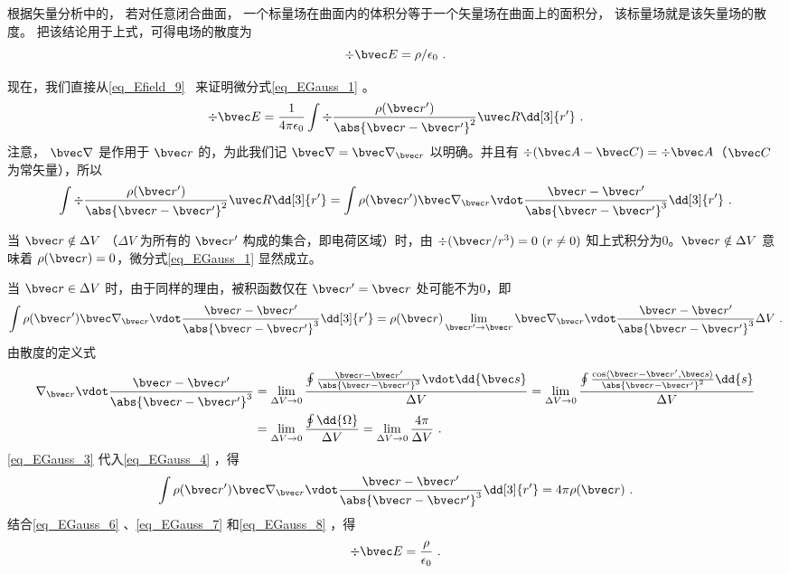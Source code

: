 根据矢量分析中的， 若对任意闭合曲面， 一个标量场在曲面内的体积分等于一个矢量场在曲面上的面积分， 该标量场就是该矢量场的散度。 把该结论用于上式，可得电场的散度为
\begin{equation}
\div \bvec E = \rho / \epsilon_0~.
\end{equation}

现在，我们直接从\autoref{eq_Efield_9}~ 来证明微分式\autoref{eq_EGauss_1} 。
\begin{equation}\label{eq_EGauss_6}
\div \bvec E=\frac{1}{4\pi\epsilon_0}\int\div\frac{\rho(\bvec r')}{\abs{\bvec r-\bvec r'}^2}\uvec R\dd[3]{r'}~.
\end{equation}
注意， $\bvec\nabla$ 是作用于 $\bvec r$ 的，为此我们记 $\bvec\nabla=\bvec\nabla_{\bvec r}$ 以明确。并且有 $\div (\bvec A-\bvec C)=\div \bvec A$（$\bvec C$ 为常矢量），所以
\begin{equation}\label{eq_EGauss_7}
\int\div\frac{\rho(\bvec r')}{\abs{\bvec r-\bvec r'}^2}\uvec R\dd[3]{r'}=\int\rho(\bvec r')\bvec\nabla_{\bvec r}\vdot\frac{\bvec r-\bvec r'}{\abs{\bvec r-\bvec r'}^3}\dd[3]{r'}~.
\end{equation}

当 $\bvec r\notin \Delta V$ （$\Delta V$ 为所有的 $\bvec r'$ 构成的集合，即电荷区域）时，由 $\div (\bvec r/r^3)=0\,\,(r\neq 0)$ 知上式积分为0。$\bvec r\notin \Delta V$ 意味着 $\rho(\bvec r)=0$，微分式\autoref{eq_EGauss_1} 显然成立。

当 $\bvec r\in \Delta V$ 时，由于同样的理由，被积函数仅在 $\bvec r'=\bvec r$ 处可能不为0，即
\begin{equation}\label{eq_EGauss_4}
\int\rho(\bvec r')\bvec\nabla_{\bvec r}\vdot\frac{\bvec r-\bvec r'}{\abs{\bvec r-\bvec r'}^3}\dd[3]{r'}=\rho(\bvec r)\lim_{\bvec r'\rightarrow\bvec r}\bvec\nabla_{\bvec r}\vdot\frac{\bvec r-\bvec r'}{\abs{\bvec r-\bvec r'}^3}\Delta V~.
\end{equation}
由散度的定义式
\begin{equation}\label{eq_EGauss_3}
\begin{aligned}
\nabla_{\bvec r}\vdot\frac{\bvec r-\bvec r'}{\abs{\bvec r-\bvec r'}^3}&=\lim_{\Delta V\rightarrow0}\frac{\oint\frac{\bvec r-\bvec r'}{\abs{\bvec r-\bvec r'}^3} \vdot\dd{\bvec s }}{\Delta V}=\lim_{\Delta V\rightarrow0}\frac{\oint\frac{\cos\langle\bvec r-\bvec r',\bvec s\rangle}{\abs{\bvec r-\bvec r'}^2} \dd{s }}{\Delta V}\\
&=\lim_{\Delta V\rightarrow0}\frac{\oint\dd{\Omega}}{\Delta V}=\lim_{\Delta V\rightarrow0}\frac{4\pi}{\Delta V}~.
\end{aligned}
\end{equation}
\autoref{eq_EGauss_3} 代入\autoref{eq_EGauss_4} ，得
\begin{equation}\label{eq_EGauss_8}
\int\rho(\bvec r')\bvec\nabla_{\bvec r}\vdot\frac{\bvec r-\bvec r'}{\abs{\bvec r-\bvec r'}^3}\dd[3]{r'}=4\pi\rho(\bvec r)~.
\end{equation}
结合\autoref{eq_EGauss_6} 、\autoref{eq_EGauss_7} 和\autoref{eq_EGauss_8} ，得
\begin{equation}
\div \bvec E=\frac{\rho}{\epsilon_0}~.
\end{equation}

